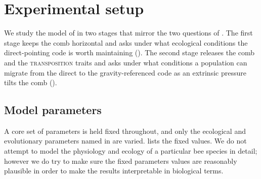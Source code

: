 \documentclass[11pt]{article}
\newcommand{\trait}[1]{\textsc{#1}}
\begin{document}
\section{Experimental setup}
We study the model of  in two stages that mirror the two
questions of . The first stage keeps the comb horizontal and asks
under what ecological conditions the direct-pointing code is worth maintaining
(). The second stage releases the comb and the
\trait{transposition} traits and asks under what conditions a population can migrate from
the direct to the gravity-referenced code as an extrinsic pressure tilts the comb
().

\subsection{Model parameters}
\label{sec:setup-fixed}
A core set of parameters is held fixed throughout, and only the ecological and
evolutionary parameters named in  are varied. 
 lists the fixed values. We do not attempt to model the 
physiology and ecology of a particular bee species in detail; however we do try to
make sure the fixed parameters values are reasonably plausible in order to make the results
 interpretable in biological terms. 
\end{document}
